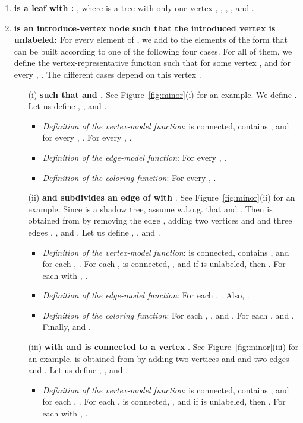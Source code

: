 \begin{enumerate}
\item {\bf  is a leaf with :} , where  is a tree with only one vertex , , , , and .

\medskip
\item {\bf  is an introduce-vertex node such that the introduced vertex   is unlabeled:}
For every element  of ,
we add  to  the elements  of the form  that can be built according to one of the following four cases. For all of them, we define the vertex-representative function such that   for some vertex , and  for every , . The different cases depend on this vertex .


\medskip
\begin{itemize}
\item[(i)] {\bf  such that   and .} See Figure~\ref{fig:minor}(i) for an example.  We define .  Let us define  , , and .
\begin{itemize}
\item \emph{Definition of the vertex-model function}:  is connected, contains ,
  and for every , . For every , .
\item \emph{Definition of the edge-model function}: For every , .
\item\emph{ Definition of the coloring function}: For every , .
\end{itemize}

\medskip
\item[(ii)] \textbf{  and  subdivides an edge  of  with }. See Figure~\ref{fig:minor}(ii) for an example.
Since  is a shadow tree, assume w.l.o.g. that  and .
Then  is obtained from  by removing the edge , adding two vertices  and  and three edges , , and . Let us define  , , and .
\begin{itemize}
\item \emph{Definition of the vertex-model function}:  is connected, contains ,
  and for each , .
  For each ,  is connected,  , and
 if  is unlabeled, then .
For each  with , .

\item \emph{Definition of the edge-model function}: For each , . Also,
  .

\item \emph{Definition of the coloring function}: For each , .   and .
For each ,    and . Finally,  and .

\end{itemize}

\medskip
\item[(iii)] \textbf{  with  and  is connected to a vertex }. See Figure~\ref{fig:minor}(iii) for an example.
  is obtained from  by adding two vertices  and  and two edges  and . Let us define , , and .
\begin{itemize}
\item \emph{Definition of the vertex-model function}:
 is connected, contains , and for each , .
For each ,  is connected, , and
 if  is unlabeled, then .
For each  with , .


\end{itemize}
\end{itemize}
\end{enumerate}
